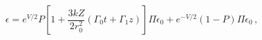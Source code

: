 \begin{equation}
\epsilon = e^{V/2} P \left[1 + \frac{3kZ}{2r_0^2}(\Gamma_0 t + \Gamma_1 z)\right]
           \Pi \epsilon_0 + e^{-V/2} (1 - P) \Pi \epsilon_0\,,
\end{equation}

